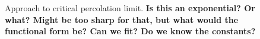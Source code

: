 \documentclass[12pt]{article} \usepackage{simplemargins}
\begin{document}
\begin{figure}
\caption{Approach to critical percolation limit. {\bf Is this an
    exponential?  Or what?  Might be too sharp for that, but what
    would the functional form be? Can we fit?  Do we know the constants?}}
\end{figure}
\end{document}
